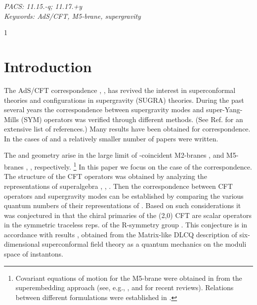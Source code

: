 \documentclass[a4paper,11pt]{article}
\begin{document}
\vspace{3cm} {\it PACS: 11.15.-q; 11.17.+y}\\ {\it Keywords:
AdS/CFT, M5-brane, supergravity}


\renewcommand{\thefootnote}{\arabic{footnote}}
\setcounter{page}1




\newpage
\section{Introduction}

The AdS/CFT correspondence \cite{jm}, \cite{gkp}, \cite{witten}
has revived the interest in superconformal theories and
\coordHE{} configurations in supergravity (SUGRA)
theories. During the past several years the correspondence between
supergravity modes and super-Yang-Mills (SYM) operators was
verified through different methods. (See Ref. \cite{agmoo} for
an extensive list of references.) Many results have been obtained
for \coordHE{} correspondence. In the cases of \coordHE{}
and \coordHE{} a relatively smaller number of papers were
written.

The \coordHE{} and \coordHE{} geometry arise \cite{gt} in the large \coordHE{}
limit of \coordHE{}-coincident M2-branes \cite{bst}, \cite{bst1} and
M5-branes \cite{pst}, \cite{blnpst}, \cite{apps} respectively.
\footnote{Covariant equations of motion for the M5-brane were
obtained in \cite{sezgin} from the superembedding approach (see,
e.g., \cite{bpstv}, and \cite{embed} for recent reviews).
Relations between different formulations were established in
\cite{blnpst1}.} In this paper we focus on the case of the
\coordHE{} correspondence. The structure of the CFT operators
was obtained by analyzing the representations of superalgebra
\coordHE{} \cite{minwalla}, \cite{aoy}, \cite{lr}. Then the
correspondence between CFT operators and supergravity modes can be
established by comparing the various quantum numbers of their
representations of \coordHE{}.  Based on such considerations it
was conjectured in \cite{minwalla1} that the chiral primaries of
the (2,0) CFT are scalar operators in the symmetric traceless
reps. of the R-symmetry group \coordHE{}. This conjecture is in
accordance with results \cite{seiberg}, \cite{abs} obtained from
the Matrix-like DLCQ description of six-dimensional \coordHE{}
superconformal field theory as a quantum mechanics on the moduli
space of instantons.
\end{document}
